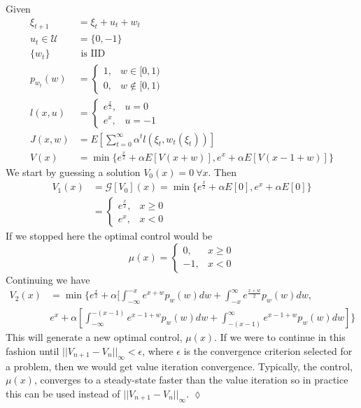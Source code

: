 \begin{example}
Given
\begin{align*}
\xi_{t+1} &= \xi_t+u_t+w_t \\
u_t\in\mathcal{U} &= \{0,-1\} \\
\{w_t\} &\text{ is IID} \\
p_{w_t}(w) &= \begin{cases} 1, & w\in[0,1) \\ 0, & w\notin[0,1) \end{cases} \\
l(x,u) &= \begin{cases} e^{\frac{x}{2}}, & u=0 \\ e^x, & u=-1 \end{cases} \\
J(x,w) &= E[\sum_{t=0}^\infty \alpha^tl(\xi_t,w_t(\xi_t))] \\
V(x) &= \min\{e^{\frac{x}{2}} + \alpha E[V(x+w)], e^x + \alpha E[V(x-1+w)]\}
\end{align*}
We start by guessing a solution $V_0(x)=0 ~\forall x$. Then
\begin{align*}
V_1(x) &= \mathcal{G}[V_0](x) = \min\{e^{\frac{x}{2}}+\alpha E[0], e^x + \alpha E[0]\} \\
&= \begin{cases} e^{\frac{x}{2}}, & x\geq0 \\ e^x, & x<0 \end{cases}
\end{align*}
If we stopped here the optimal control would be
$$\mu(x) = \begin{cases} 0, & x\geq0 \\ -1, & x<0 \end{cases}$$
Continuing we have
\begin{align*}
V_2(x) &= \min\{e^{\frac{x}{2}} + \alpha[\int_{-\infty}^{-x} e^{x+w}p_w(w)dw + \int_{-x}^\infty e^{\frac{x+w}{2}}p_w(w)dw, \\
&e^x+\alpha[\int_{-\infty}^{-(x-1)}e^{x-1+w}p_w(w)dw + \int_{-(x-1)}^\infty e^{x-1+w}p_w(w)dw]\}
\end{align*}
This will generate a new optimal control, $\mu(x)$. If we were to continue in this fashion until $||V_{n+1}-V_n||_\infty<\epsilon$, where $\epsilon$ is the convergence criterion selected for a problem, then we would get value iteration convergence. Typically, the control, $\mu(x)$, converges to a steady-state faster than the value iteration so in practice this can be used instead of $||V_{n+1}-V_n||_\infty$.
$\lozenge$
\end{example}

